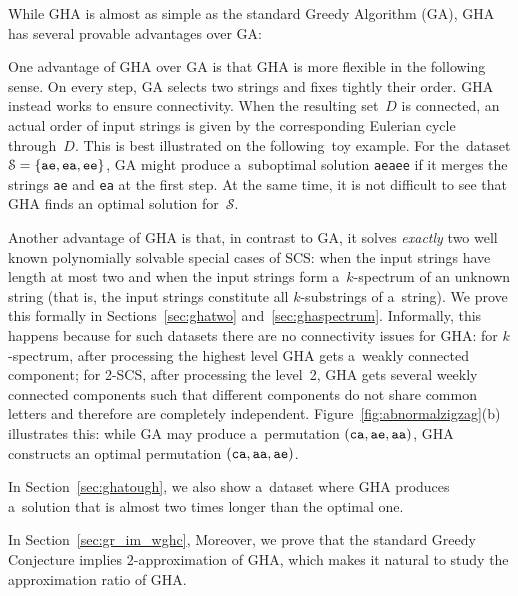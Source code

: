 While GHA is almost as simple as the standard Greedy Algorithm (GA), GHA has several provable advantages over GA:
\begin{description}
\item One advantage of GHA over GA is that GHA is more flexible in the following sense. On every step, GA selects two strings and fixes tightly their order. GHA instead works to ensure connectivity. When the resulting set~$D$ is connected, an actual order of input strings is given by the corresponding Eulerian cycle through~$D$. This is best illustrated on the following~toy example. For the~dataset $\mathcal{S}=\{{\tt ae}, {\tt ea}, {\tt ee}\}$, GA might produce a~suboptimal solution {\tt aeaee} if it merges the strings {\tt ae} and {\tt ea} at the first step. At the same time, it is not difficult to see that GHA finds an optimal solution for~$\mathcal{S}$.
\item Another advantage of GHA is that, in contrast to GA, it solves {\em exactly} two well known polynomially solvable special cases of SCS: when the input strings have length at most two and when the input strings form a~$k$-spectrum of an unknown string (that is, the input strings constitute all
$k$-substrings of a~string). We prove this formally in Sections~\ref{sec:ghatwo} and~\ref{sec:ghaspectrum}. Informally, this happens because for such datasets there are no connectivity issues for GHA: for $k$-spectrum, after processing the highest level GHA gets a~weakly connected component; for 2-SCS, after processing the level~2, GHA gets several weekly connected components such that different components do not share common letters and therefore are completely independent. Figure~\ref{fig:abnormalzigzag}(b) illustrates this: while GA may produce a~permutation $({\tt ca}, {\tt ae}, {\tt aa})$, GHA constructs an optimal
permutation $({\tt ca}, {\tt aa}, {\tt ae})$.

In Section~\ref{sec:ghatough}, we also show a~dataset where GHA produces a~solution that is almost two times longer than the optimal one.

\item In Section~\ref{sec:gr_im_wghc}, 
Moreover, we prove that the standard Greedy Conjecture implies $2$-approximation of GHA, which makes it natural to study the approximation ratio of GHA.
\end{description}
  

